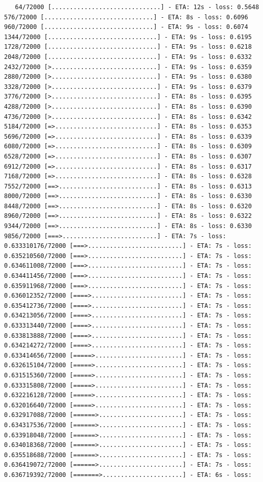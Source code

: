 \documentclass[12pt,fleqn]{article}\usepackage{../../common}
\begin{document}
\begin{verbatim}
   64/72000 [..............................] - ETA: 12s - loss: 0.5648  576/72000 [..............................] - ETA: 8s - loss: 0.6096   960/72000 [..............................] - ETA: 9s - loss: 0.6074 1344/72000 [..............................] - ETA: 9s - loss: 0.6195 1728/72000 [..............................] - ETA: 9s - loss: 0.6218 2048/72000 [..............................] - ETA: 9s - loss: 0.6332 2432/72000 [>.............................] - ETA: 9s - loss: 0.6359 2880/72000 [>.............................] - ETA: 9s - loss: 0.6380 3328/72000 [>.............................] - ETA: 9s - loss: 0.6379 3776/72000 [>.............................] - ETA: 8s - loss: 0.6395 4288/72000 [>.............................] - ETA: 8s - loss: 0.6390 4736/72000 [>.............................] - ETA: 8s - loss: 0.6342 5184/72000 [=>............................] - ETA: 8s - loss: 0.6353 5696/72000 [=>............................] - ETA: 8s - loss: 0.6339 6080/72000 [=>............................] - ETA: 8s - loss: 0.6309 6528/72000 [=>............................] - ETA: 8s - loss: 0.6307 6912/72000 [=>............................] - ETA: 8s - loss: 0.6317 7168/72000 [=>............................] - ETA: 8s - loss: 0.6328 7552/72000 [==>...........................] - ETA: 8s - loss: 0.6313 8000/72000 [==>...........................] - ETA: 8s - loss: 0.6330 8448/72000 [==>...........................] - ETA: 8s - loss: 0.6320 8960/72000 [==>...........................] - ETA: 8s - loss: 0.6322 9344/72000 [==>...........................] - ETA: 8s - loss: 0.6330 9856/72000 [===>..........................] - ETA: 7s - loss: 0.633310176/72000 [===>..........................] - ETA: 7s - loss: 0.635210560/72000 [===>..........................] - ETA: 7s - loss: 0.634611008/72000 [===>..........................] - ETA: 7s - loss: 0.634411456/72000 [===>..........................] - ETA: 7s - loss: 0.635911968/72000 [===>..........................] - ETA: 7s - loss: 0.636012352/72000 [====>.........................] - ETA: 7s - loss: 0.635412736/72000 [====>.........................] - ETA: 7s - loss: 0.634213056/72000 [====>.........................] - ETA: 7s - loss: 0.633313440/72000 [====>.........................] - ETA: 7s - loss: 0.633813888/72000 [====>.........................] - ETA: 7s - loss: 0.634214272/72000 [====>.........................] - ETA: 7s - loss: 0.633414656/72000 [=====>........................] - ETA: 7s - loss: 0.632615104/72000 [=====>........................] - ETA: 7s - loss: 0.631515360/72000 [=====>........................] - ETA: 7s - loss: 0.633315808/72000 [=====>........................] - ETA: 7s - loss: 0.632216128/72000 [=====>........................] - ETA: 7s - loss: 0.632016640/72000 [=====>........................] - ETA: 7s - loss: 0.632917088/72000 [======>.......................] - ETA: 7s - loss: 0.634317536/72000 [======>.......................] - ETA: 7s - loss: 0.633918048/72000 [======>.......................] - ETA: 7s - loss: 0.634018368/72000 [======>.......................] - ETA: 7s - loss: 0.635518688/72000 [======>.......................] - ETA: 7s - loss: 0.636419072/72000 [======>.......................] - ETA: 7s - loss: 0.636719392/72000 [=======>......................] - ETA: 6s - loss: 
\end{verbatim}
\end{document}
